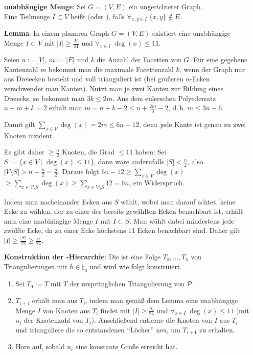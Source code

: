 \linie

\textbf{unabhängige Menge}:
Sei $G = (V, E)$ ein ungerichteter Graph.\\
Eine Teilmenge $I \subset V$ heißt  (oder ), falls
$\forall_{x, y \in I}\; \{x, y\} \notin E$.

\textbf{Lemma}:
In einem planaren Graph $G = (V, E)$ existiert eine unabhängige Menge $I \subset V$ mit
$|I| \ge \frac{|V|}{24}$ und $\forall_{x \in I}\; \deg(x) \le 11$.

\begin{Beweis}
    Seien $n := |V|$, $m := |E|$ und $k$ die Anzahl der Facetten von $G$.
    Für eine gegebene Kantenzahl $m$ bekommt man die maximale Facettenzahl $k$,
    wenn der Graph nur aus Dreiecken besteht und voll trianguliert ist
    (bei größeren $n$-Ecken verschwendet man Kanten).
    Nutzt man je zwei Kanten zur Bildung eines Dreiecks,
    so bekommt man $3k \le 2m$.
    Aus dem eulerschen Polyedersatz $n - m + k = 2$ erhält man
    $m = n + k - 2 \le n + \frac{2m}{3} - 2$, d.\,h. $m \le 3n - 6$.

    Damit gilt $\sum_{x \in V} \deg(x) = 2m \le 6n - 12$, denn jede Kante ist genau zu zwei Knoten
    inzident.

    Es gibt daher $\ge \frac{n}{2}$ Knoten, die Grad $\le 11$ haben:
    Sei $S := \{x \in V \;|\; \deg(x) \le 11\}$, dann wäre andernfalls $|S| < \frac{n}{2}$, also
    $|V \setminus S| > n - \frac{n}{2} = \frac{n}{2}$.
    Daraus folgt
    $6n - 12 \ge \sum_{x \in V} \deg(x)$\\
    $\ge \sum_{x \in V \setminus S} \deg(x)
    \ge \sum_{x \in V \setminus S} 12 = 6n$, ein Widerspruch.

    Indem man nacheinander Ecken aus $S$ wählt, wobei man darauf achtet, keine Ecke zu wählen,
    der zu einer der bereits gewählten Ecken benachbart ist,
    erhält man eine unabhängige Menge $I$ mit $I \subset S$.
    Man wählt dabei mindestens jede zwölfte Ecke, da zu einer Ecke höchstens $11$ Ecken benachbart
    sind.
    Daher gilt $|I| \ge \frac{|S|}{12} \ge \frac{n}{24}$.
\end{Beweis}

\linie

\textbf{Konstruktion der -Hierarchie}:
Die  ist eine Folge $T_0, \dotsc, T_h$
von Triangulierungen mit $h \in \natural_0$ und wird wie folgt konstruiert.
\begin{enumerate}
    \item
    Sei $T_0 := T$ mit $T$ der ursprünglichen Triangulierung von $\P$.

    \item
    $T_{i+1}$ erhält man aus $T_i$, indem man gemäß dem Lemma eine unabhängige Menge
    $I$ von Knoten aus $T_i$ findet mit
    $|I| \ge \frac{n_i}{24}$ und $\forall_{x \in I}\; \deg(x) \le 11$
    (mit $n_i$ der Knotenzahl von $T_i$).
    Anschließend entferne die Knoten von $I$ aus $T_i$ und trianguliere die
    so entstandenen "`Löcher"' neu, um $T_{i+1}$ zu erhalten.

    \item
    Höre auf, sobald $n_i$ eine konstante Größe erreicht hat.
\end{enumerate}

